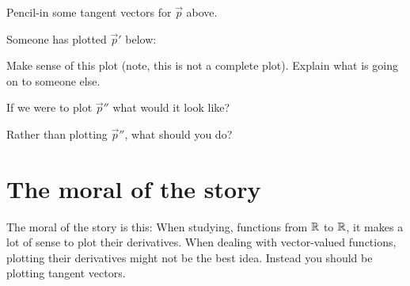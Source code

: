 \documentclass[handout,hints,noauthor,nooutcomes]{ximera}
\begin{document}
\begin{problem}
  Pencil-in some tangent vectors for $\vec{p}$ above. 
\end{problem}



\begin{problem}
  Someone has plotted $\vec{p}'$ below:
  \begin{image}
  \end{image}
  Make sense of this plot (note, this is not a complete plot). Explain
  what is going on to someone else.
\end{problem}

\begin{problem}
  If we were to plot $\vec{p}''$ what would it look like?
\end{problem}

\begin{problem}
  Rather than plotting $\vec{p}''$, what should you do?
\end{problem}


\section{The moral of the story}


The moral of the story is this: When studying, functions from $\mathbb R$ to
$\mathbb R$, it makes a lot of sense to plot their derivatives. When dealing
with vector-valued functions, plotting their derivatives might not be
the best idea. Instead you should be plotting tangent vectors.
\end{document}
